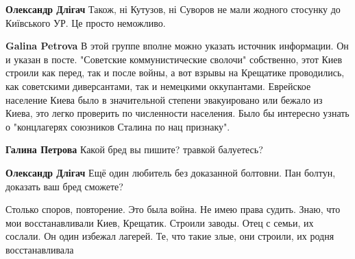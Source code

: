 \begin{itemize}
\begin{itemize}
\begin{itemize}
\textbf{Олександр Длігач} Також, ні Кутузов, ні Суворов не мали жодного стосунку до Київського УР. Це просто неможливо.

 
\textbf{Galina Petrova} В этой группе вполне можно указать источник информации. Он и указан в посте. "Советские коммунистические сволочи" собственно, этот Киев строили как перед, так и после войны, а вот взрывы на Крещатике проводились, как советскими диверсантами, так и немецкими оккупантами. Еврейское население Киева было в значительной степени эвакуировано или бежало из Киева, это легко проверить по численности населения. Было бы интересно узнать о "концлагерях союзников Сталина по нац признаку".

 
\textbf{Галина Петрова} Какой бред вы пишите? травкой балуетесь?


 
\textbf{Олександр Длігач} Ещё один любитель без доказанной болтовни. Пан болтун, доказать ваш бред сможете?

\end{itemize}

 

Столько споров, повторение. Это была война. Не имею права судить. Знаю, что мои
восстанавливали Киев, Крещатик. Строили заводы. Отец с семьи, их сослали. Он
один избежал лагерей. Те, что такие злые, они строили, их родня восстанавливала
\end{itemize}

 

\end{itemize}
